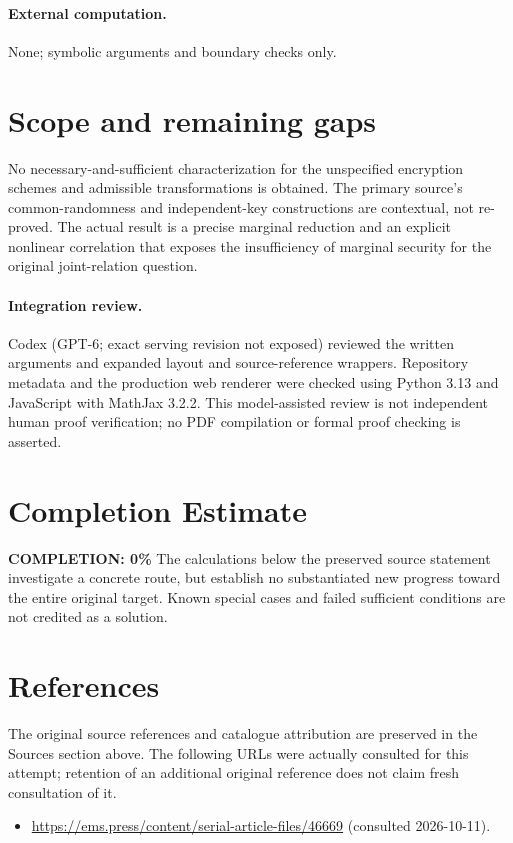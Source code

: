 \documentclass[11pt]{article}
\begin{document}
\paragraph{External computation.} None; symbolic arguments and boundary checks only.
\section{Scope and remaining gaps}
No necessary-and-sufficient characterization for the unspecified encryption schemes and admissible transformations is obtained. The primary source's common-randomness and independent-key constructions are contextual, not re-proved. The actual result is a precise marginal reduction and an explicit nonlinear correlation that exposes the insufficiency of marginal security for the original joint-relation question.
\paragraph{Integration review.} Codex (GPT-6; exact serving revision not exposed) reviewed the written arguments and expanded layout and source-reference wrappers. Repository metadata and the production web renderer were checked using Python 3.13 and JavaScript with MathJax 3.2.2. This model-assisted review is not independent human proof verification; no PDF compilation or formal proof checking is asserted.

\section{Completion Estimate}
\noindent\textbf{COMPLETION: 0\%}
The calculations below the preserved source statement investigate a concrete route,
but establish no substantiated new progress toward the entire original target.
Known special cases and failed sufficient conditions are not credited as a solution.
\section{References}
The original source references and catalogue attribution are preserved in the
Sources section above. The following URLs were actually consulted for this attempt;
retention of an additional original reference does not claim fresh consultation of it.
\begin{itemize}
\item \url{https://ems.press/content/serial-article-files/46669} (consulted 2026-10-11). 
\end{itemize}
\end{document}
